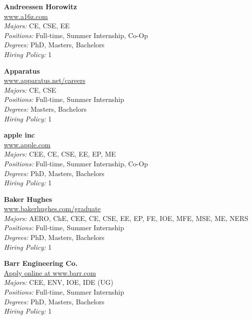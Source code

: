 \documentclass{article}
\begin{document}
\begin{center}
\begin{multicols}{3}
\begin{minipage}{.9\columnwidth}{\Large\bf Andreessen Horowitz }\\
	\url{www.a16z.com}\\
	\emph{Majors:} CE, CSE, EE\\
	\emph{Positions:} Full-time, Summer Internship, Co-Op\\
	\emph{Degrees:} PhD, Masters, Bachelors\\
	\emph{Hiring Policy:} 1\\
\end{minipage}
 
\begin{minipage}{.9\columnwidth}{\Large\bf Apparatus }\\
	\url{www.apparatus.net/careers}\\
	\emph{Majors:} CE, CSE\\
	\emph{Positions:} Full-time, Summer Internship\\
	\emph{Degrees:} Masters, Bachelors\\
	\emph{Hiring Policy:} 1\\
\end{minipage}
 
\begin{minipage}{.9\columnwidth}{\Large\bf apple inc }\\
	\url{www.apple.com}\\
	\emph{Majors:} CEE, CE, CSE, EE, EP, ME\\
	\emph{Positions:} Full-time, Summer Internship, Co-Op\\
	\emph{Degrees:} PhD, Masters, Bachelors\\
	\emph{Hiring Policy:} 1\\
\end{minipage}
 
\begin{minipage}{.9\columnwidth}{\Large\bf Baker Hughes }\\
	\url{www.bakerhughes.com/graduate}\\
	\emph{Majors:} AERO, ChE, CEE, CE, CSE, EE, EP, FE, IOE, MFE, MSE, ME, NERS\\
	\emph{Positions:} Full-time, Summer Internship\\
	\emph{Degrees:} PhD, Masters, Bachelors\\
	\emph{Hiring Policy:} 1\\
\end{minipage}
 
\begin{minipage}{.9\columnwidth}{\Large\bf Barr Engineering Co. }\\
	\url{Apply online at www.barr.com}\\
	\emph{Majors:} CEE, ENV, IOE, IDE (UG)\\
	\emph{Positions:} Full-time, Summer Internship\\
	\emph{Degrees:} PhD, Masters, Bachelors\\
	\emph{Hiring Policy:} 1\\
\end{minipage}
 

\end{multicols}
\end{center}
\end{document}
